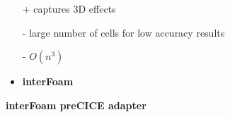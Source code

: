 \begin{frame}
\begin{minipage}{0.15\textwidth}
\end{minipage}
\begin{minipage}{0.35\textwidth}
\begin{tcolorbox} [
colframe=TUMOrange,
colback=TUMOrange!50,
title = \centering Navier-Stokes\\3D]     
\begin{itemize}
\item[+] captures 3D effects
\item[-] large number of cells for low accuracy results
\item[-] $O(n^3)$\vspace{0.6cm}
\item \large \textbf{interFoam}
\end{itemize}
\end{tcolorbox}
\vspace{1cm}
\hspace{-1cm}
\vspace{0.3cm}
\begin{tcolorbox}[
colframe=TUMOrange,
colback=TUMOrange!50] 
{\large \textbf{interFoam preCICE adapter}}
\end{tcolorbox}  
\end{minipage}


%
 \end{frame}
 
 
 
